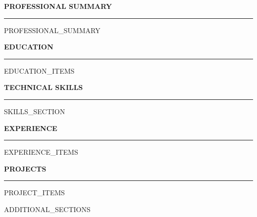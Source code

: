 \documentclass[11pt,letterpaper]{article}
\newenvironment{rSection}[1]{
  \sectionskip
  \MakeUppercase{\bfseries #1}
  \sectionlineskip
  \hrule
  \begin{list}{}{
    \setlength{\leftmargin}{1.5em}
  }
  \item[]
}{
  \end{list}
}
\def\sectionlineskip{\medskip}
\def\sectionskip{\medskip}
\begin{document}
\begin{rSection}{PROFESSIONAL SUMMARY}
{{PROFESSIONAL_SUMMARY}}
\end{rSection}

\begin{rSection}{EDUCATION}
{{EDUCATION_ITEMS}}
\end{rSection}

\begin{rSection}{TECHNICAL SKILLS}
{{SKILLS_SECTION}}
\end{rSection}

\begin{rSection}{EXPERIENCE}
{{EXPERIENCE_ITEMS}}
\end{rSection}

\begin{rSection}{PROJECTS}
{{PROJECT_ITEMS}}
\end{rSection}

{{ADDITIONAL_SECTIONS}}
\end{document}
